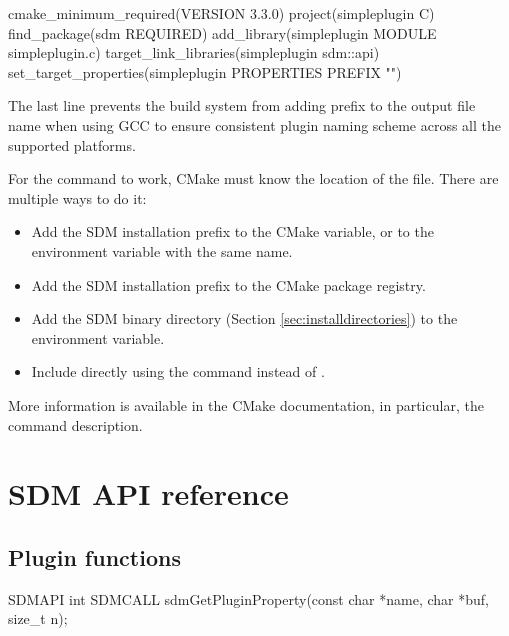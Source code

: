 \documentclass[a4paper,12pt,twoside,extrafontsizes]{memoir}
\begin{document}
\begin{shellcmds}
cmake\_minimum\_required(VERSION 3.3.0)
project(simpleplugin C)
find\_package(sdm REQUIRED)
add\_library(simpleplugin MODULE simpleplugin.c)
target\_link\_libraries(simpleplugin sdm::api)
set\_target\_properties(simpleplugin PROPERTIES PREFIX "")
\end{shellcmds}

The last line prevents the build system from adding  prefix to the output file name when using GCC to ensure consistent plugin naming scheme across all the supported platforms.

For the  command to work, CMake must know the location of the  file. There are multiple ways to do it:

\begin{itemize}
	\item Add the SDM installation prefix to the  CMake variable, or to the environment variable with the same name.
	\item Add the SDM installation prefix to the CMake package registry.
	\item Add the SDM binary directory (Section \ref{sec:installdirectories}) to the  environment variable.
	\item Include  directly using the  command instead of .
\end{itemize}

More information is available in the CMake documentation, in particular, the  command description.

\chapter{SDM API reference}
\label{ch:sdmapireference}

\section{Plugin functions}



\begin{cfuncprototype}
SDMAPI int SDMCALL sdmGetPluginProperty(const char *name, char *buf, size_t n);
\end{cfuncprototype}
\end{document}
